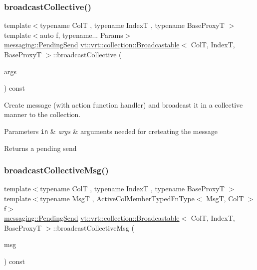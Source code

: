 \subsubsection{\texorpdfstring{broadcast\+Collective()}{broadcastCollective()}\hspace{0.1cm}{\footnotesize\ttfamily [3/3]}}
{\footnotesize\ttfamily template$<$typename ColT , typename IndexT , typename Base\+ProxyT $>$ \\
template$<$auto f, typename... Params$>$ \\
\hyperlink{structvt_1_1messaging_1_1_pending_send}{messaging\+::\+Pending\+Send} \hyperlink{structvt_1_1vrt_1_1collection_1_1_broadcastable}{vt\+::vrt\+::collection\+::\+Broadcastable}$<$ ColT, IndexT, Base\+ProxyT $>$\+::broadcast\+Collective (\begin{DoxyParamCaption}\item[{Params \&\&...}]{args }\end{DoxyParamCaption}) const}



Create message (with action function handler) and broadcast it in a collective manner to the collection. 


\begin{DoxyParams}[1]{Parameters}
\mbox{\tt in}  & {\em args} & arguments needed for creteating the message\\
\hline
\end{DoxyParams}
\begin{DoxyReturn}{Returns}
a pending send 
\end{DoxyReturn}
\mbox{\label{structvt_1_1vrt_1_1collection_1_1_broadcastable_a70ec0f06ef5566c713a4d960a8faa39b}} 
\subsubsection{\texorpdfstring{broadcast\+Collective\+Msg()}{broadcastCollectiveMsg()}\hspace{0.1cm}{\footnotesize\ttfamily [1/3]}}
{\footnotesize\ttfamily template$<$typename ColT , typename IndexT , typename Base\+ProxyT $>$ \\
template$<$typename MsgT , Active\+Col\+Member\+Typed\+Fn\+Type$<$ Msg\+T, Col\+T $>$ f$>$ \\
\hyperlink{structvt_1_1messaging_1_1_pending_send}{messaging\+::\+Pending\+Send} \hyperlink{structvt_1_1vrt_1_1collection_1_1_broadcastable}{vt\+::vrt\+::collection\+::\+Broadcastable}$<$ ColT, IndexT, Base\+ProxyT $>$\+::broadcast\+Collective\+Msg (\begin{DoxyParamCaption}\item[{\hyperlink{structvt_1_1messaging_1_1_msg_ptr_thief}{messaging\+::\+Msg\+Ptr\+Thief}$<$ MsgT $>$}]{msg }\end{DoxyParamCaption}) const}



